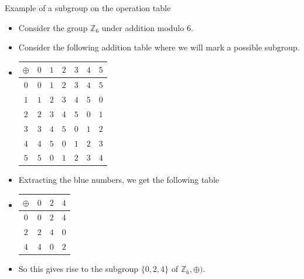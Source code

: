 \documentclass[ %
 10pt, xcolor={dvipsnames,svgnames,x11names,hyperref},
   hyperref={colorlinks=true,citecolor=green,linkcolor=DarkRed,urlcolor=ProcessBlue,anchorcolor=blue}
  ]{beamer}
\newenvironment{stepitemize}{\begin{itemize}[<+->]}{\end{itemize} }
\newcommand{\Z}{\mathbb{Z}}
\begin{document}
\begin{frame}{Example of a subgroup on the operation table}
\begin{stepitemize}
\item Consider the group $\Z_6$ under addition modulo $6$.
\item Consider the following addition table where we will mark a possible subgroup.
\item[]
\begin{table}[H]
\begin{tabular}{ c| c | c |c|c|c|c}
$\oplus$  & {\color{blue} $0$} & $1$ & {\color{blue} $2$} & $3$ & {\color{blue} $4$} & $5$\\
\hline
{\color{blue} $0$}&{\color{blue} $0$} & $1$ & {\color{blue} $2$} & $3$ & {\color{blue} $4$} & $5$\\
\hline
$1$&$1$ & $2$ & $3$ & $4$ & $5$ & $0$\\
\hline
{\color{blue} $2$} &{\color{blue} $2$} & $3$ & {\color{blue} $4$} & $5$ & {\color{blue} $0$} & $1$\\
\hline
$3$&$3$ & $4$ & $5$ & $0$ & $1$ & $2$\\
\hline
{\color{blue} $4$}&{\color{blue} $4$} & $5$ & {\color{blue} $0$} & $1$ & {\color{blue} $2$} & $3$\\
\hline
$5$&$5$ & $0$ & $1$ & $2$ & $3$ & $4$\\
\end{tabular}
\end{table}
\item Extracting the blue numbers, we get the following table
\item[]
\begin{table}[H]
\begin{tabular}{ c| c | c |c}
$\oplus$  & {\color{blue} $0$} & {\color{blue} $2$} &  {\color{blue} $4$}\\
\hline
{\color{blue} $0$}&{\color{blue} $0$} & {\color{blue} $2$} & {\color{blue} $4$}\\
\hline
{\color{blue} $2$} &{\color{blue} $2$} & {\color{blue} $4$} & {\color{blue} $0$}\\
\hline
{\color{blue} $4$}&{\color{blue} $4$} & {\color{blue} $0$} & {\color{blue} $2$}\\
\end{tabular}
\end{table}
\item So this gives rise to the subgroup $\{0,2,4\}$ of $\Z_6, \oplus)$.
\end{stepitemize}

\end{frame}
\end{document}
